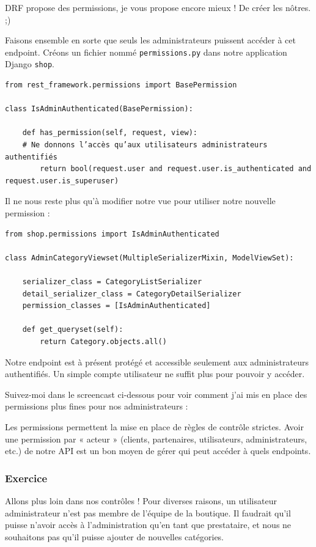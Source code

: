 DRF propose des permissions, je vous propose encore mieux ! De {\color{monOrange}créer les nôtres}. ;)

Faisons ensemble en sorte que {\color{monOrange}seuls les administrateurs} puissent accéder à cet endpoint. Créons un fichier nommé {\tt permissions.py}  dans notre application Django {\tt shop}.
\begin{verbatim}
from rest_framework.permissions import BasePermission
 
class IsAdminAuthenticated(BasePermission):
 
    def has_permission(self, request, view):
    # Ne donnons l’accès qu’aux utilisateurs administrateurs authentifiés
        return bool(request.user and request.user.is_authenticated and request.user.is_superuser)
\end{verbatim}
Il ne nous reste plus qu’à modifier notre vue pour utiliser notre nouvelle permission :
\begin{verbatim}
from shop.permissions import IsAdminAuthenticated
 
class AdminCategoryViewset(MultipleSerializerMixin, ModelViewSet):
 
    serializer_class = CategoryListSerializer
    detail_serializer_class = CategoryDetailSerializer
    permission_classes = [IsAdminAuthenticated]
 
    def get_queryset(self):
        return Category.objects.all()
\end{verbatim}
Notre endpoint est à présent {\color{monOrange}protégé} et accessible seulement aux {\color{monOrange}administrateurs authentifiés}. Un simple compte utilisateur ne suffit plus pour pouvoir y accéder.

Suivez-moi dans le screencast ci-dessous pour voir comment j'ai mis en place des permissions plus fines pour nos administrateurs :


Les permissions permettent la mise en place de règles de contrôle strictes. Avoir une permission par « acteur » (clients, partenaires, utilisateurs, administrateurs, etc.) de notre API est un bon moyen de gérer qui peut accéder à quels endpoints.

\subsubsection*{Exercice}
Allons plus loin dans nos contrôles ! Pour diverses raisons, un utilisateur administrateur n’est pas membre de l’équipe de la boutique. Il faudrait qu'il puisse n'avoir accès à l’administration qu'en tant que {\color{monOrange}prestataire}, et nous ne souhaitons pas qu’il puisse ajouter de nouvelles catégories.

